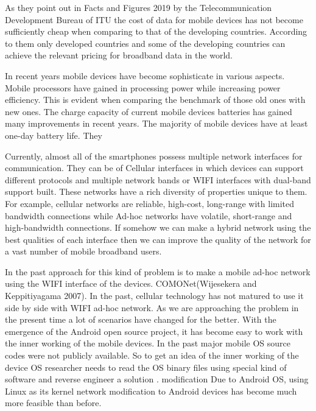 \vspace{12pt}


As they point out in Facts and Figures 2019 by the Telecommunication Development Bureau of ITU\cite{no_of_mobile_devices_ICTFacts} the cost of data for mobile devices has not become sufficiently cheap when comparing to that of the developing countries. According to them only developed countries and some of the developing countries can achieve the relevant pricing for broadband data in the world. 


\vspace{12pt}
\clearpage


In recent years mobile devices have become sophisticate in various aspects. Mobile processors have gained in processing power while increasing power efficiency. This is evident when comparing the benchmark of those old ones with new ones. The charge capacity of current mobile devices batteries has gained many improvements in recent years. The majority of mobile devices have at least one-day battery life. They

\vspace{12pt}


Currently, almost all of the smartphones possess multiple network interfaces for communication. They can be of Cellular interfaces in which devices can support different protocols and multiple network bands or  WIFI  interfaces with dual-band support built. These networks have a rich diversity of properties unique to them. For example, cellular networks are reliable, high-cost, long-range with limited bandwidth connections while Ad-hoc networks have volatile, short-range and high-bandwidth connections. If somehow we can make a hybrid network using the best qualities of each interface then we can improve the quality of the network for a vast number of mobile broadband users.

\vspace{12pt}


In the past approach for this kind of problem is to make a mobile ad-hoc network using the  WIFI  interface of the devices. COMONet(Wijesekera and Keppitiyagama 2007)\cite{comonet}. In the past, cellular technology has not matured to use it side by side with  WIFI  ad-hoc network. As we are approaching the problem in the present time a lot of scenarios have changed for the better. With the emergence of the Android open source project, it has become easy to work with the inner working of the mobile devices. In the past major mobile OS source codes were not publicly available. So to get an idea of the inner working of the device OS researcher needs to read the OS binary files using special kind of software and reverse engineer a solution \cite{comonet}. modification  Due to Android  OS, using Linux as its kernel network modification to Android devices has become much more feasible than before.
 
